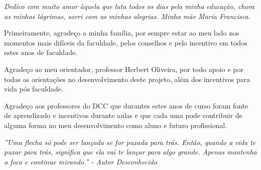 \documentclass[
	12pt,				%
    oneside,			%
	a4paper,			%
	chapter=TITLE,		%
	english,			%
	brazil				%
	]{abntex2}
\begin{document}
\frenchspacing 


\imprimircapa

\imprimirfolhaderosto

\imprimirfolhadeaprovacao
\begin{dedicatoria}
   \vspace*{\fill}
   \centering
   \noindent
   \textit{Dedico com muito amor àquela que luta todos os dias pela minha educação, chora as minhas lágrimas, sorri com as minhas alegrias. Minha mãe Maria Francisca.} \vspace*{\fill}
\end{dedicatoria}

\begin{agradecimentos}[Agradecimentos]
\par
Primeiramente, agradeço a minha família, por sempre estar ao meu lado nos momentos mais difíceis da faculdade, pelos conselhos e pelo incentivo em todos estes anos de faculdade.
\par
Agradeço ao meu orientador, professor Herbert Oliveira, por todo apoio e por todas as orientações no desenvolvimento deste projeto, além dos incentivos para vida pós faculdade.

\par
Agradeço aos professores do DCC que durantes estes anos de curso foram fonte de aprendizado e incentivos durante aulas e que cada uma pode contribuir de alguma forma no meu desenvolvimento como aluno e futuro profissional.

\end{agradecimentos}

\begin{epigrafe}
    \vspace*{\fill}
	\begin{flushright}
		\textit{''Uma flecha só pode ser lançada se for puxada para trás. Então, quando a vida te puxar para trás, significa que ela vai te lançar para algo grande. Apenas mantenha o foco e continue mirando.''  - Autor Desconhecido }
	\end{flushright}
\end{epigrafe}
\end{document}
